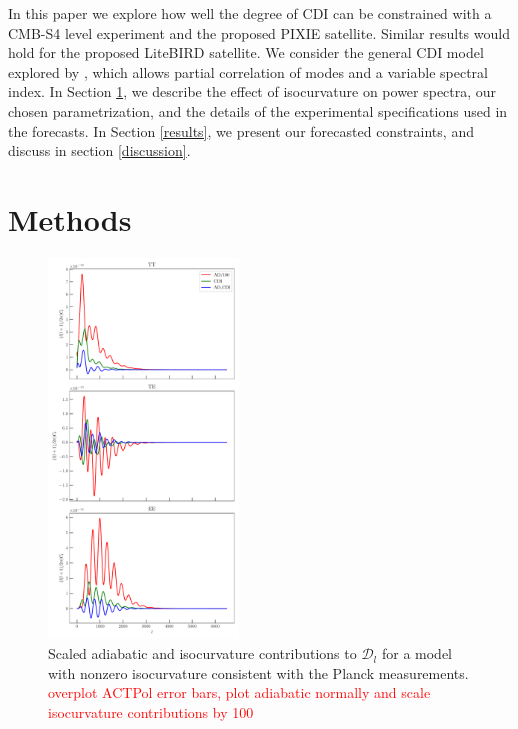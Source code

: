 \documentclass{emulateapj}
\newcommand\writingnote[1]{\textcolor{red}{#1}}
\begin{document}
In this paper we explore how well the degree of CDI can be constrained with a CMB-S4 level experiment and the proposed PIXIE satellite.  Similar results would hold for the proposed LiteBIRD satellite. We consider the general CDI model explored by \citet{planck_inflation}, which allows partial correlation of modes and a variable spectral index. 
In Section \ref{methods}, we describe the effect of isocurvature on power spectra, our chosen parametrization, and the details of the experimental specifications used in the forecasts. In Section \ref{results}, we present our forecasted constraints, and discuss in section \ref{discussion}.


\section{Methods}\label{methods}

\begin{figure}[h]
\includegraphics[width=0.45\textwidth]{figures/isocurvature_fiducial_spectra_contributions.pdf}
\caption{Scaled adiabatic and isocurvature contributions to $\mathcal{D}_l$ for a model with nonzero isocurvature consistent with the Planck measurements. \writingnote{overplot ACTPol error bars, plot adiabatic normally and scale isocurvature contributions by 100}\label{fig:effects}}
\end{figure}
\end{document}
